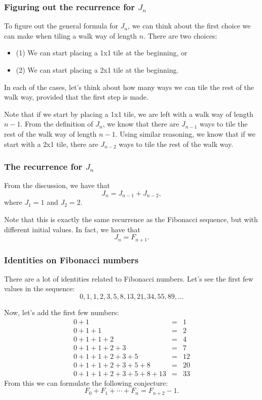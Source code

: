 \begin{frame}\frametitle{Figuring out the recurrence for $J_n$}
  To figure out the general formula for $J_n$, we can think about the
  first choice we can make when tiling a walk way of length $n$.
  There are two choices:
  \begin{itemize}
  \item (1) We can start placing a 1x1 tile at the beginning, or
  \item (2) We can start placing a 2x1 tile at the beginning.
  \end{itemize}

  In each of the cases, let's think about how many ways we can tile
  the rest of the walk way, provided that the first step is made.

  \vspace{0.1in}
  Note that if we start by placing a 1x1 tile, we are left with a walk
  way of length $n-1$.  From the definition of $J_n$, we know that
  there are $J_{n-1}$ ways to tile the rest of the walk way of length
  $n-1$.  Using similar reasoning, we know that if we start with a 2x1
  tile, there are $J_{n-2}$ ways to tile the rest of the walk way.
\end{frame}

\begin{frame}\frametitle{The recurrence for $J_n$}
  \begin{tcolorbox}
    From the discussion, we have that
    \[ J_n = J_{n-1} + J_{n-2}, \]
    where $J_1=1$ and $J_2=2$.
  \end{tcolorbox}

  Note that this is exactly the same recurrence as the Fibonacci
  sequence, but with different initial values.  In fact, we have that
  \[ J_n = F_{n+1}. \]
\end{frame}

\begin{frame}\frametitle{Identities on Fibonacci numbers}
  There are a lot of identities related to Fibonacci numbers.  Let's
  see the first few values in the sequence:
  \[
  0,1,1,2,3,5,8,13,21,34,55,89,\ldots
  \]

  Now, let's add the first few numbers:
  \begin{eqnarray*}
    0+1 &=& 1\\
    0+1+1 &=& 2\\
    0+1+1+2 &=& 4\\
    0+1+1+2+3 &=& 7\\
    0+1+1+2+3+5 &=& 12\\
    0+1+1+2+3+5+8 &=& 20\\
    0+1+1+2+3+5+8+13 &=& 33
  \end{eqnarray*}
  From this we can formulate the following conjecture:
  \[ F_0+F_1+\cdots+F_n = F_{n+2} - 1.\]
\end{frame}

